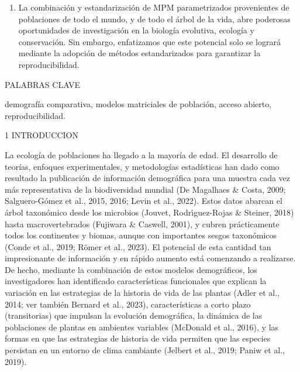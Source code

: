 \documentclass[
  12pt,
  letterpaper,
]{book}
\begin{document}
\begin{enumerate}
  estandarizadas para difundir y compartir los MPM. Además, más del 85\%
  de los 300 MPM evaluados por COMPADRE y COMADRE omitieron uno o más de
  los elementos clave para su correcta interpretación. Basado en estos
  resultados, identificamos los principales problemas que pueden surgir
  a partir de la construcción y difusión de los MPM y ofrecemos
  sugerencias para mejorar la claridad y la reproducibilidad y así
  contribuir a la investigación futura utilizando MPM y los metadatos
  requeridos. Para fortalecer la reproducibilidad y capacitar a los
  investigadores para aprovechar al máximo sus datos demográficos,
  presentamos un protocolo estandarizado para presentar los MPM en las
  publicaciones. Este estándar está vinculado con el contenido de
  www.compadre-db.org, para que los autores que deseen archivar sus MPM
  puedan hacerlo antes de someter sus publicaciones, siguiendo ejemplos
  de otros repositorios de acceso abierto como DRYAD, Figshare y Zenodo.
\item
  La combinación y estandarización de MPM parametrizados provenientes de
  poblaciones de todo el mundo, y de todo el árbol de la vida, abre
  poderosas oportunidades de investigación en la biología evolutiva,
  ecología y conservación. Sin embargo, enfatizamos que este potencial
  solo se logrará mediante la adopción de métodos estandarizados para
  garantizar la reproducibilidad.
\end{enumerate}

PALABRAS CLAVE

demografía comparativa, modelos matriciales de población, acceso
abierto, reproducibilidad.

1 \textbar{} INTRODUCCION

La ecología de poblaciones ha llegado a la mayoría de edad. El
desarrollo de teorías, enfoques experimentales, y metodologías
estadísticas han dado como resultado la publicación de información
demográfica para una muestra cada vez más representativa de la
biodiversidad mundial (De Magalhaes \& Costa, 2009; Salguero-Gómez et
al., 2015, 2016; Levin et al., 2022). Estos datos abarcan el árbol
taxonómico desde los microbios (Jouvet, Rodrı́guez-Rojas \& Steiner,
2018) hasta macrovertebrados (Fujiwara \& Caswell, 2001), y cubren
prácticamente todos los continentes y biomas, aunque con importantes
sesgos taxonómicos (Conde et al., 2019; Römer et al., 2023). El
potencial de esta cantidad tan impresionante de información y en rápido
aumento está comenzando a realizarse. De hecho, mediante la combinación
de estos modelos demográficos, los investigadores han identificado
características funcionales que explican la variación en las estrategias
de la historia de vida de las plantas (Adler et al., 2014; ver también
Bernard et al., 2023), características a corto plazo (transitorias) que
impulsan la evolución demográfica, la dinámica de las poblaciones de
plantas en ambientes variables (McDonald et al., 2016), y las formas en
que las estrategias de historia de vida permiten que las especies
persistan en un entorno de clima cambiante (Jelbert et al., 2019; Paniw
et al., 2019).
\end{document}

